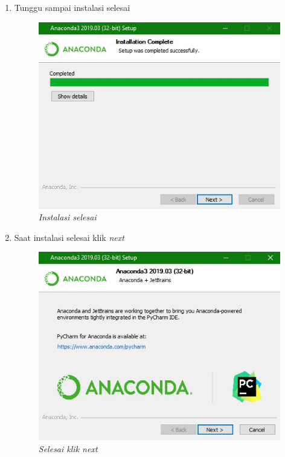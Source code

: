 \begin{enumerate}
\item Tunggu sampai instalasi selesai


\begin{figure}[!htbp]
    \centering
    \includegraphics[scale=0.6]{gambar/7.jpg}
    \caption{\textit{Instalasi selesai}}
    \label{Figure7}
\end{figure}

\item Saat instalasi selesai klik \textit{next}


\begin{figure}[!htbp]
    \centering
    \includegraphics[scale=0.6]{gambar/8.jpg}
    \caption{\textit{Selesai klik next}}
    \label{Figure8}
\end{figure}


\end{enumerate}
